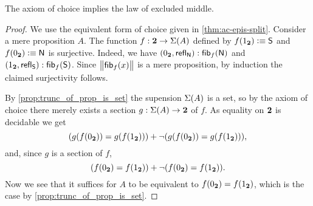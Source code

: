 \begin{thm}[Diaconescu]\label{thm:1surj_to_surj_to_pem}
  The axiom of choice implies the law of excluded middle.
\end{thm}

\begin{proof}
We use the equivalent form of choice given in \autoref{thm:ac-epis-split}.
Consider a mere proposition $A$.
The function $f:\mathbf{2}\to\Sigma(A)$ defined by
$f({1_{\mathbf{2}}}) \vcentcolon\equiv \mathsf{S}$ and $f({0_{\mathbf{2}}}) \vcentcolon\equiv \mathsf{N}$
is surjective.
Indeed, we have
${\mathopen{}({0_{\mathbf{2}}},\mathsf{refl}_{\mathsf{N}})\mathclose{}} : {\mathsf{fib}}_{f}(\mathsf{N})$
and ${\mathopen{}({1_{\mathbf{2}}},\mathsf{refl}_{\mathsf{S}})\mathclose{}} :{\mathsf{fib}}_{f}(\mathsf{S})$.
Since $\bigl\Vert {\mathsf{fib}}_{f}(x)\bigr\Vert_{}$ is a mere proposition, by induction the claimed surjectivity follows.

By \autoref{prop:trunc_of_prop_is_set} the supension $\Sigma(A)$
is a set, so by the axiom of choice there merely exists a
section $g: \Sigma(A) \to \mathbf{2}$ of $f$.
As equality on $\mathbf{2}$ is decidable we get
\begin{equation*}
 (g(f({0_{\mathbf{2}}}))= g(f({1_{\mathbf{2}}}))) +
 \lnot (g(f({0_{\mathbf{2}}}))= g(f({1_{\mathbf{2}}}))),
\end{equation*}
and, since $g$ is a section of $f$,
\begin{equation*}
(f({0_{\mathbf{2}}}) = f({1_{\mathbf{2}}})) +
\lnot (f({0_{\mathbf{2}}}) = f({1_{\mathbf{2}}})).
\end{equation*}
Now we see that it suffices for $A$ to be equivalent to
$f({0_{\mathbf{2}}}) = f({1_{\mathbf{2}}})$, which is the case by \autoref{prop:trunc_of_prop_is_set}.
\end{proof}




